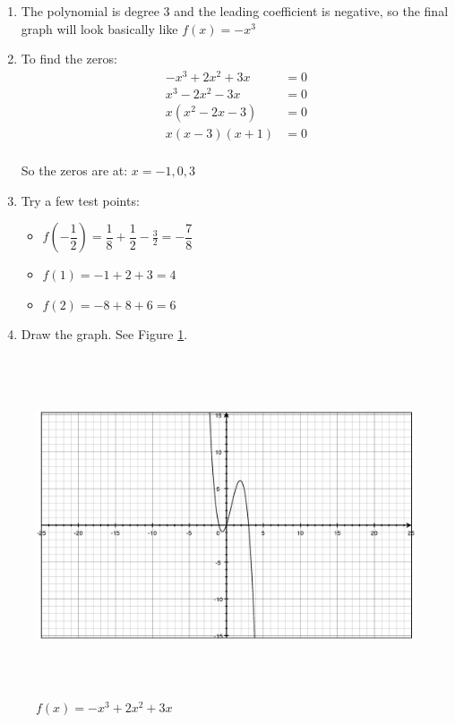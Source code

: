 \documentclass[fleqn,addpoints]{exam}
\begin{document}
\begin{enumerate}

\item The polynomial is degree 3 and the leading coefficient is negative, so the final graph will look basically like $f(x) = -x^3$

\item To find the zeros:
\begin{align*}
  -x^3 + 2x^2 + 3x &= 0 \\
  x^3 - 2x^2 - 3x &= 0 \\
  x(x^2 - 2x - 3) &= 0 \\
  x(x-3)(x+1) &= 0 \\
\end{align*}

So the zeros are at: $x = {-1, 0, 3}$

\item
Try a few test points:
\begin{itemize}
  \item $f\left( -\dfrac{1}{2} \right) = \dfrac{1}{8} + \dfrac{1}{2} -\frac{3}{2} = -\dfrac{7}{8}$
  \item $f(1) = -1+2+3 = 4$
  \item $f(2) = -8 + 8 + 6 = 6$
\end{itemize}

\item Draw the graph.  See Figure \ref{example}.
\end{enumerate}

\begin{figure}[H]
  \centering
  \includegraphics[width=14cm,height=10cm]{example.eps}
  \caption{$f(x) = -x^3 + 2x^2 + 3x$}
  \label{example}
\end{figure}


 
\end{document}
